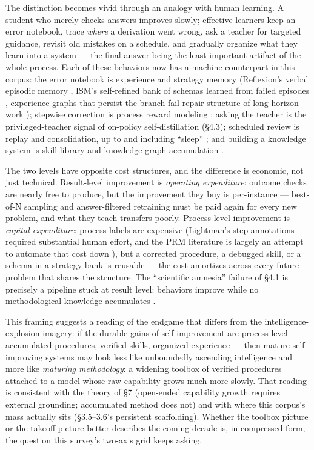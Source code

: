 \documentclass[
  11pt,
]{article}
\begin{document}
The distinction becomes vivid through an analogy with human learning. A
student who merely checks answers improves slowly; effective learners
keep an error notebook, trace \emph{where} a derivation went wrong, ask
a teacher for targeted guidance, revisit old mistakes on a schedule, and
gradually organize what they learn into a system --- the final answer
being the least important artifact of the whole process. Each of these
behaviors now has a machine counterpart in this corpus: the error
notebook is experience and strategy memory (Reflexion's verbal episodic
memory \citep{shinn2023reflexion}, ISM's self-refined bank of schemas
learned from failed episodes \citep{dixit2026ism}, experience graphs
that persist the branch-fail-repair structure of long-horizon work
\citep{liao2026experience, feng2026expgraph}); stepwise correction is
process reward modeling \citep{lightman2023verify, lee2026efficient};
asking the teacher is the privileged-teacher signal of on-policy
self-distillation (§4.3); scheduled review is replay and consolidation,
up to and including ``sleep''
\citep{behrouz2026language, dorovatas2026continual}; and building a
knowledge system is skill-library and knowledge-graph accumulation
\citep{wang2023voyager, wu2026knowledge}.

The two levels have opposite cost structures, and the difference is
economic, not just technical. Result-level improvement is
\emph{operating expenditure}: outcome checks are nearly free to produce,
but the improvement they buy is per-instance --- best-of-N sampling and
answer-filtered retraining must be paid again for every new problem, and
what they teach transfers poorly. Process-level improvement is
\emph{capital expenditure}: process labels are expensive (Lightman's
step annotations required substantial human effort, and the PRM
literature is largely an attempt to automate that cost down
\citep{lee2026efficient}), but a corrected procedure, a debugged skill,
or a schema in a strategy bank is reusable --- the cost amortizes across
every future problem that shares the structure. The ``scientific
amnesia'' failure of §4.1 is precisely a pipeline stuck at result level:
behaviors improve while no methodological knowledge accumulates
\citep{lin2026repeated}.

This framing suggests a reading of the endgame that differs from the
intelligence-explosion imagery: if the durable gains of self-improvement
are process-level --- accumulated procedures, verified skills, organized
experience --- then mature self-improving systems may look less like
unboundedly ascending intelligence and more like \emph{maturing
methodology}: a widening toolbox of verified procedures attached to a
model whose raw capability grows much more slowly. That reading is
consistent with the theory of §7 (open-ended capability growth requires
external grounding; accumulated method does not) and with where this
corpus's mass actually sits (§3.5--3.6's persistent scaffolding).
Whether the toolbox picture or the takeoff picture better describes the
coming decade is, in compressed form, the question this survey's
two-axis grid keeps asking.
\end{document}
